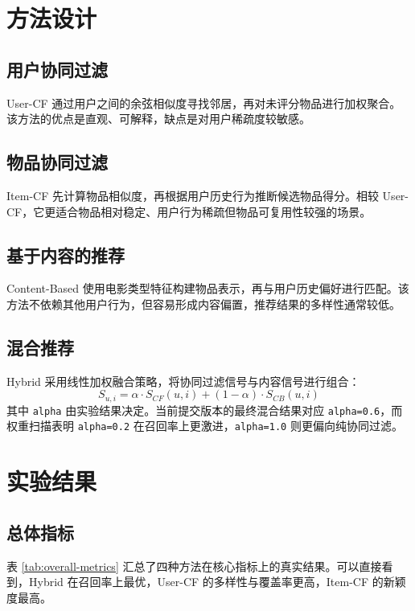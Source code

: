 \documentclass[UTF8,a4paper,12pt,fontset=fandol]{ctexart}
\begin{document}
\section{方法设计}
\subsection{用户协同过滤}
User-CF 通过用户之间的余弦相似度寻找邻居，再对未评分物品进行加权聚合。该方法的优点是直观、可解释，缺点是对用户稀疏度较敏感。

\subsection{物品协同过滤}
Item-CF 先计算物品相似度，再根据用户历史行为推断候选物品得分。相较 User-CF，它更适合物品相对稳定、用户行为稀疏但物品可复用性较强的场景。

\subsection{基于内容的推荐}
Content-Based 使用电影类型特征构建物品表示，再与用户历史偏好进行匹配。该方法不依赖其他用户行为，但容易形成内容偏置，推荐结果的多样性通常较低。

\subsection{混合推荐}
Hybrid 采用线性加权融合策略，将协同过滤信号与内容信号进行组合：
\[
S_{u,i} = \alpha \cdot S_{CF}(u,i) + (1-\alpha) \cdot S_{CB}(u,i)
\]
其中 \texttt{alpha} 由实验结果决定。当前提交版本的最终混合结果对应 \texttt{alpha=0.6}，而权重扫描表明 \texttt{alpha=0.2} 在召回率上更激进，\texttt{alpha=1.0} 则更偏向纯协同过滤。

\section{实验结果}
\subsection{总体指标}
表 \ref{tab:overall-metrics} 汇总了四种方法在核心指标上的真实结果。可以直接看到，Hybrid 在召回率上最优，User-CF 的多样性与覆盖率更高，Item-CF 的新颖度最高。
\end{document}
